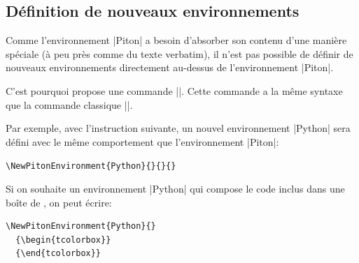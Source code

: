 \documentclass[dvipsnames]{article}
\begin{document}
\subsection{Définition de nouveaux environnements}

Comme l'environnement |{Piton}| a besoin d'absorber son contenu d'une manière spéciale (à peu près comme du texte
verbatim), il n'est pas possible de définir de nouveaux environnements directement au-dessus de l'environnement
|{Piton}|.

C'est pourquoi  propose une commande |\NewPitonEnvironment|. Cette commande a la même syntaxe que la
commande classique |\NewDocumentEnvironment|.

\bigskip
Par exemple, avec l'instruction suivante, un nouvel environnement |{Python}| sera défini avec le même comportement
que l'environnement |{Piton}|:

\verb|\NewPitonEnvironment{Python}{}{}{}|

\bigskip
Si on souhaite un environnement |{Python}| qui compose le code inclus dans une boîte de , on peut
écrire:

\begin{verbatim}
\NewPitonEnvironment{Python}{}
  {\begin{tcolorbox}}
  {\end{tcolorbox}}
\end{verbatim}
\end{document}
